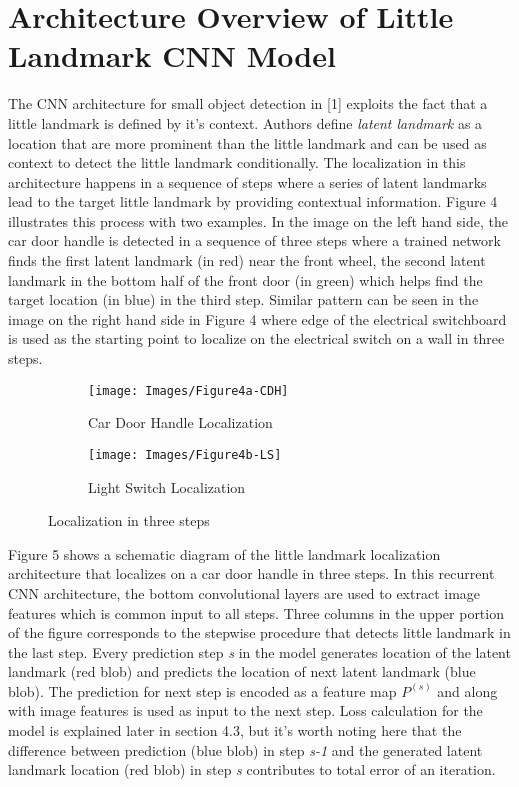 \documentclass [11pt,letterpaper ,twoside ,openany ]{report}
\begin{document}
    \section{Architecture Overview of Little Landmark CNN Model}
    The CNN architecture for small object detection in [1] exploits the fact that a little landmark is defined by it's context. Authors define \textit {latent landmark} as a location that are more prominent than the little landmark and can be used as context to detect the little landmark conditionally. The localization in this architecture happens in a sequence of steps where a series of latent landmarks lead to the target little landmark by providing contextual information. Figure 4 illustrates this process with two examples. In the image on the left hand side, the car door handle is detected in a sequence of three steps where a trained network finds the first latent landmark (in red) near the front wheel, the second latent landmark in the bottom half of the front door (in green) which helps find the target location (in blue) in the third step. Similar pattern can be seen in the image on the right hand side in Figure 4 where edge of the electrical switchboard is used as the starting point to localize on the electrical switch on a wall in three steps.

    \begin{figure}[h!]
    \centering
        \begin{subfigure}[b]{0.45\linewidth}
            \texttt{[image: Images/Figure4a-CDH]}
            \caption{Car Door Handle Localization}
        \end{subfigure}
        \begin{subfigure}[b]{0.45\linewidth}
            \texttt{[image: Images/Figure4b-LS]}
            \caption{Light Switch Localization}
        \end{subfigure}
        \caption{Localization in three steps}
        \label{fig:coffee}
    \end{figure}

    Figure 5 shows a schematic diagram of the little landmark localization architecture that localizes on a car door handle in three steps. In this recurrent CNN architecture, the bottom convolutional layers are used to extract image features which is common input to all steps.  Three columns in the upper portion of the figure corresponds to the stepwise procedure that detects little landmark in the last step. Every prediction step \textit {s} in the model generates location of the latent landmark (red blob) and predicts the location of next latent landmark (blue blob). The prediction for next step is encoded as a feature map \(P^{(s)}\) and along with image features is used as input to the next step. Loss calculation for the model is explained later in section 4.3, but it's worth noting here that the difference between prediction (blue blob) in step \textit {s-1} and the generated latent landmark location (red blob) in step \textit {s} contributes to total error of an iteration.
\end{document}
